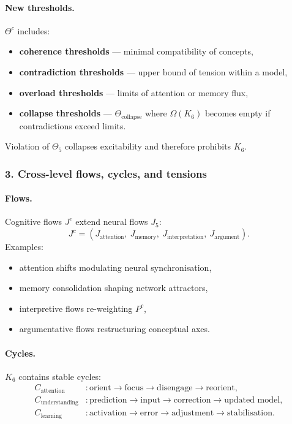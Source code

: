 \paragraph{New thresholds.}
$\Theta^{c}$ includes:
\begin{itemize}
  \item \textbf{coherence thresholds} — minimal compatibility of concepts,
  \item \textbf{contradiction thresholds} — upper bound of tension within a model,
  \item \textbf{overload thresholds} — limits of attention or memory flux,
  \item \textbf{collapse thresholds} — $\Theta_{\mathrm{collapse}}$ where
        $\Omega(K_6)$ becomes empty if contradictions exceed limits.
\end{itemize}

Violation of $\Theta_5$ collapses excitability and therefore prohibits $K_6$.

\subsubsection{3. Cross-level flows, cycles, and tensions}

\paragraph{Flows.}
Cognitive flows $J^{c}$ extend neural flows $J_5$:
\[
J^{c} = (J_{\mathrm{attention}},\ J_{\mathrm{memory}},\
        J_{\mathrm{interpretation}},\ J_{\mathrm{argument}}).
\]
Examples:
\begin{itemize}
  \item attention shifts modulating neural synchronisation,
  \item memory consolidation shaping network attractors,
  \item interpretive flows re-weighting $P^{c}$,
  \item argumentative flows restructuring conceptual axes.
\end{itemize}

\paragraph{Cycles.}
$K_6$ contains stable cycles:
\begin{align*}
C_{\mathrm{attention}} &: \text{orient} \rightarrow \text{focus}
    \rightarrow \text{disengage} \rightarrow \text{reorient},\\[4pt]
C_{\mathrm{understanding}} &: \text{prediction} \rightarrow \text{input}
    \rightarrow \text{correction} \rightarrow \text{updated model},\\[4pt]
C_{\mathrm{learning}} &: \text{activation} \rightarrow \text{error}
    \rightarrow \text{adjustment} \rightarrow \text{stabilisation}.
\end{align*}

